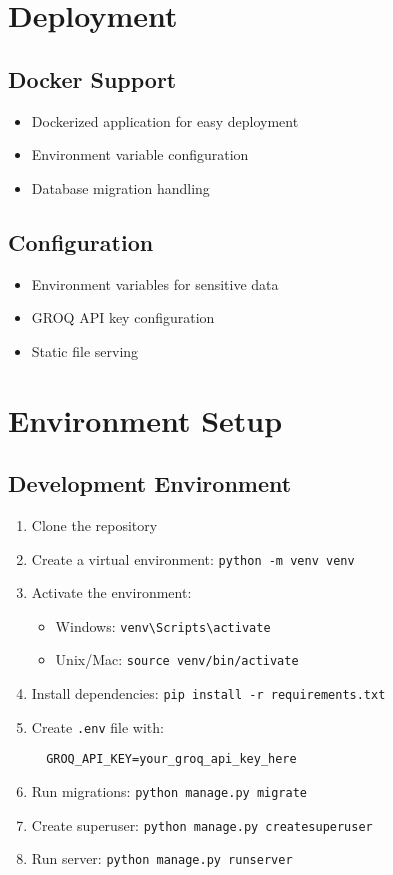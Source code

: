 \documentclass[11pt]{article}
\begin{document}
\section{Deployment}

\subsection{Docker Support}
\begin{itemize}
  \item Dockerized application for easy deployment
  \item Environment variable configuration
  \item Database migration handling
\end{itemize}

\subsection{Configuration}
\begin{itemize}
  \item Environment variables for sensitive data
  \item GROQ API key configuration
  \item Static file serving
\end{itemize}

\section{Environment Setup}

\subsection{Development Environment}
\begin{enumerate}
  \item Clone the repository
  \item Create a virtual environment: \texttt{python -m venv venv}
  \item Activate the environment:
  \begin{itemize}
    \item Windows: \texttt{venv\textbackslash Scripts\textbackslash activate}
    \item Unix/Mac: \texttt{source venv/bin/activate}
  \end{itemize}
  \item Install dependencies: \texttt{pip install -r requirements.txt}
  \item Create \texttt{.env} file with:
  \begin{verbatim}
  GROQ_API_KEY=your_groq_api_key_here
  \end{verbatim}
  \item Run migrations: \texttt{python manage.py migrate}
  \item Create superuser: \texttt{python manage.py createsuperuser}
  \item Run server: \texttt{python manage.py runserver}
\end{enumerate}
\end{document}
